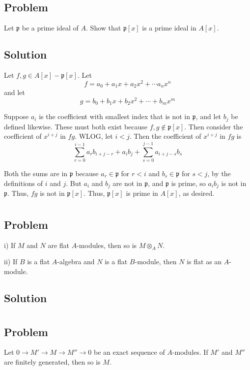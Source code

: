 \documentclass[book,12pt,oneside,openany]{memoir}
\begin{document}
\subsection{Problem}
Let $\mathfrak{p}$ be a prime ideal of $A$. Show that $\mathfrak{p}[x]$ is a prime ideal in $A[x]$.

\subsection{Solution}
Let $f,g \in A[x] - \mathfrak{p}[x]$. Let \[f = a_0 + a_1x + a_2x^2 + \cdots a_n x^n\] and let \[g = b_0 + b_1 x + b_2 x^2 + \cdots + b_m x^m\]

Suppose $a_i$ is the coefficient with smallest index that is not in $\mathfrak{p}$, and let $b_j$ be defined likewise. These must both exist because $f,g \notin \mathfrak{p}[x]$. Then consider the coefficient of $x^{i+j}$ in $fg$. WLOG, let $i < j$. Then the coefficient of $x^{i+j}$ in $fg$ is \[\sum_{r = 0}^{i-1} a_r b_{i+j-r} + a_i b_j + \sum_{s = 0}^{j-1} a_{i+j-s}b_s\]

Both the sums are in $\mathfrak{p}$ because $a_r \in \mathfrak{p}$ for $r < i$ and $b_s \in \mathfrak{p}$ for $s < j$, by the definitions of $i$ and $j$. But $a_i$ and $b_j$ are not in $\mathfrak{p}$, and $\mathfrak{p}$ is prime, so $a_i b_j$ is not in $\mathfrak{p}$. Thus, $fg$ is not in $\mathfrak{p}[x]$. Thus, $\mathfrak{p}[x]$ is prime in $A[x]$, as desired.

\section{}
\subsection{Problem}

i) If $M$ and $N$ are flat $A$-modules, then so is $M \otimes_{A} N $.

ii) If $B$ is a flat $A$-algebra and $N$ is a flat $B$-module, then $N$ is flat as an $A$-module.

\subsection{Solution}


\section{}
\subsection{Problem}
Let $0 \rightarrow M' \rightarrow M \rightarrow M'' \rightarrow 0$ be an exact sequence of $A$-modules. If $M'$ and $M''$ are finitely generated, then so is $M$.
\end{document}
